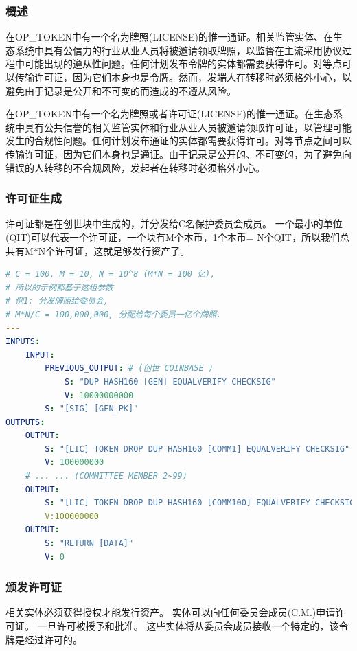 \documentclass[a4paper,11pt]{article}
\begin{document}
\subsubsection{概述}


在OP\_TOKEN中有一个名为牌照(LICENSE)的惟一通证。相关监管实体、在生态系统中具有公信力的行业从业人员将被邀请领取牌照，以监督在主流采用协议过程中可能出现的遵从性问题。任何计划发布令牌的实体都需要获得许可。对等点可以传输许可证，因为它们本身也是令牌。然而，发端人在转移时必须格外小心，以避免由于记录是公开和不可变的而造成的不遵从风险。

在OP\_TOKEN中有一个名为牌照或者许可证(LICENSE)的惟一通证。在生态系统中具有公共信誉的相关监管实体和行业从业人员被邀请领取许可证，以管理可能发生的合规性问题。任何计划发布通证的实体都需要获得许可。对等节点之间可以传输许可证，因为它们本身也是通证。由于记录是公开的、不可变的，为了避免向错误的人转移的不合规风险，发起者在转移时必须格外小心。
 

\subsubsection{许可证生成}


许可证都是在创世块中生成的，并分发给C名保护委员会成员。
一个最小的单位(QIT)可以代表一个许可证，一个块有M个本币，1个本币= N个QIT，所以我们总共有M*N个许可证，这就足够发行资产了。


\begin{lstlisting}[language=yaml, numbers=none,basicstyle=\footnotesize]
# C = 100, M = 10, N = 10^8 (M*N = 100 亿),
# 所以的示例都基于这组参数 
# 例1: 分发牌照给委员会,
# M*N/C = 100,000,000, 分配给每个委员一亿个牌照.
---
INPUTS:
	INPUT:
		PREVIOUS_OUTPUT: # (创世 COINBASE )
			S: "DUP HASH160 [GEN] EQUALVERIFY CHECKSIG"
			V: 10000000000
		S: "[SIG] [GEN_PK]"
OUTPUTS:
	OUTPUT:
		S: "[LIC] TOKEN DROP DUP HASH160 [COMM1] EQUALVERIFY CHECKSIG"
		V: 100000000
	# ... ... (COMMITTEE MEMBER 2~99)
	OUTPUT:
		S: "[LIC] TOKEN DROP DUP HASH160 [COMM100] EQUALVERIFY CHECKSIG"
		V:100000000
	OUTPUT:
		S: "RETURN [DATA]"
		V: 0
\end{lstlisting}



\subsubsection{颁发许可证}


相关实体必须获得授权才能发行资产。
实体可以向任何委员会成员(C.M.)申请许可证。
一旦许可被授予和批准。
这些实体将从委员会成员接收一个特定的，该令牌是经过许可的。
\end{document}
